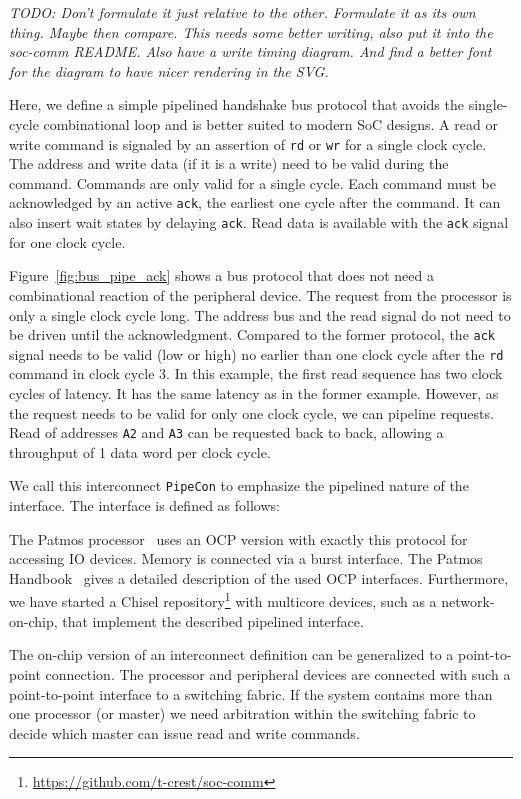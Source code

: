 \documentclass[%
    10pt,
    headinclude, footinclude=false,
    openright, %
    notitlepage,
    cleardoublepage=empty,
    headsepline,
    numbers=noenddot,
    bibliography=totoc, index=totoc,
    ]{scrbook}
\newcommand{\code}[1]{{\lstinline[basicstyle=\small\ttfamily]{#1}}}
\newcommand{\todo}[1]{{\emph{TODO: #1}}}
\newcommand{\myref}[2]{\href{#1}{#2}}
\renewcommand{\myref}[2]{{#2}{\footnote{\url{#1}}}}
\begin{document}
\todo{Don't formulate it just relative to the other. Formulate it as its own thing.
Maybe then compare. This needs some better writing, also put it into the soc-comm README.
Also have a write timing diagram. And find a better font for the diagram to have nicer
rendering in the SVG.}

Here, we define a simple pipelined handshake bus protocol that avoids the single-cycle combinational loop and is better suited to modern SoC designs.
 A read or write command is signaled by an assertion of \code{rd} or \code{wr}
 for a single clock cycle.
The address and write data (if it is a write) need to be valid during
the command. Commands are only valid for a single cycle.
Each command must be acknowledged by an active \code{ack},
the earliest one cycle after the command. It can also insert wait
states by delaying \code{ack}. Read data is available with the \code{ack}
signal for one clock cycle.

Figure~\ref{fig:bus_pipe_ack} shows a bus protocol that does not need
a combinational reaction of the peripheral device. The request from the processor
is only a single clock cycle long. The address bus and the read signal do not need to be driven
until the acknowledgment. Compared to the former protocol, the \code{ack} signal needs to
be valid (low or high)
no earlier than one clock cycle after the \code{rd} command in clock cycle 3.
In this example, the first read sequence has two clock cycles of latency.
It has the same latency as in the former example.
However, as the request needs to be valid for only one clock cycle, we can pipeline
requests. Read of addresses \code{A2} and \code{A3} can be requested back to back,
allowing a throughput of 1 data word per clock cycle.

We call this interconnect \code{PipeCon} to emphasize the pipelined nature of
the interface. The interface is defined as follows:


The Patmos processor~\cite{patmos:rts2018} uses an OCP version with exactly this
protocol for accessing IO devices. Memory is connected via a burst interface.
The Patmos Handbook~\cite{patmos:handbook} gives a detailed description of the
used OCP interfaces.
Furthermore, we have started a
\myref{https://github.com/t-crest/soc-comm}{Chisel repository} with multicore devices, such as
a network-on-chip, that implement the described pipelined interface.

The on-chip version of an interconnect definition can be generalized to a point-to-point
connection. The processor and peripheral devices are connected with such a point-to-point
interface to a switching fabric. If the system contains more than one processor (or master)
we need arbitration within the switching fabric to decide which master can issue
read and write commands.
\end{document}
